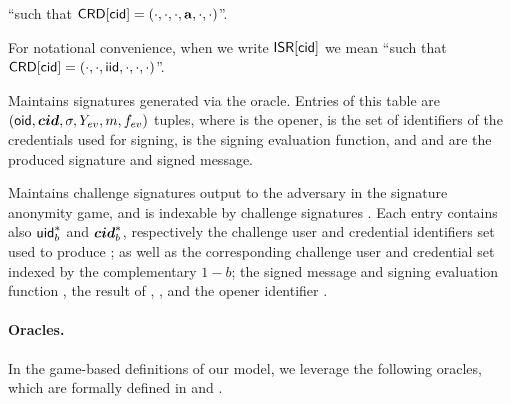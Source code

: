 \begin{description}
  ``\attrs such that $\mathsf{CRD}[\mathsf{cid}] = (\cdot,\cdot,\cdot,\mathbf{a},\cdot,\cdot)$''.
\item[\ISR.] For notational convenience, when we write $\mathsf{ISR}[\mathsf{cid}]$ we mean
  ``\iid such that $\mathsf{CRD}[\mathsf{cid}] = (\cdot,\cdot,\mathsf{iid},\cdot,\cdot,\cdot)$''.
\item[\SIG.] Maintains signatures generated via the \SIGN oracle. Entries of
  this table are $(\mathsf{oid},\boldsymbol{cid},\sigma,Y_{ev},m,f_{ev})$ tuples, where \oid is
  the opener, \scid is the set of identifiers of the credentials used for
  signing, \feval is the signing evaluation function, and \sig and \msg are the
  produced signature and signed message.
\item[\CSIG.] Maintains challenge signatures output to the adversary in the
  signature anonymity game, and is indexable by challenge signatures \csig.
  Each entry contains also $\mathsf{uid}^*_b$ and $\boldsymbol{cid}^*_b$, respectively the challenge
  user  and credential identifiers set used to produce \csig; as well as the
  corresponding challenge user and credential set indexed by the complementary
  $1-b$; the signed message \msg and signing evaluation function \feval, the
  result of \feval, \Yeval, and the opener identifier \oid.
\end{description}

\paragraph{Oracles.} %
In the game-based definitions of our \UAS model, we leverage the following
oracles, which are formally defined in  and
. 

